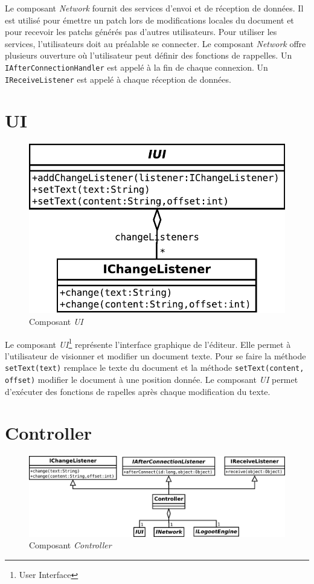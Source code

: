   Le composant \emph{Network} fournit des services d'envoi et de réception de
  données. Il est utilisé pour émettre un patch lors de modifications locales
  du document et pour recevoir les patchs générés pas d'autres utilisateurs.
  Pour utiliser les services, l'utilisateurs doit au préalable se connecter.
  Le composant \emph{Network} offre plusieurs ouverture où l'utilisateur peut
  définir des fonctions de rappelles. Un \verb?IAfterConnectionHandler? est
  appelé à la fin de chaque connexion. Un \verb?IReceiveListener? est appelé
  à chaque réception de données.

  \section{UI}
  \begin{figure}[hbt]
    \center
    \label{fig:logootengine}
    \includegraphics[width=.5\textwidth]{includes/model/IUI.pdf}
    \caption{Composant \emph{UI}}
  \end{figure}

  Le composant \emph{UI}\footnote{User Interface} représente l'interface
  graphique de l'éditeur. Elle permet à l'utilisateur de visionner et modifier
  un document texte. Pour se faire la méthode \verb?setText(text)? remplace le 
  texte du document et la méthode \verb?setText(content, offset)?
  modifier le document à une position donnée. Le composant \emph{UI} permet
  d'exécuter des fonctions de rapelles après chaque modification du texte.

  \section{Controller}
  \begin{figure}[hbt]
    \center
    \label{fig:logootengine}
    \includegraphics[width=.9\textwidth]{includes/model/Controller.pdf}
    \caption{Composant \emph{Controller}}
  \end{figure}

